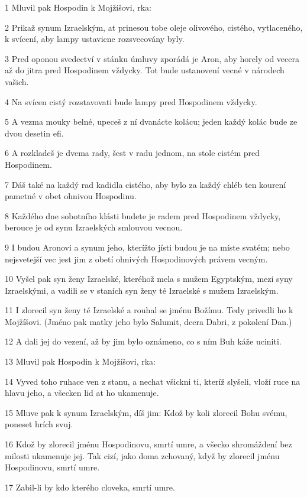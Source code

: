\par 1 Mluvil pak Hospodin k Mojžíšovi, rka:
\par 2 Prikaž synum Izraelským, at prinesou tobe oleje olivového, cistého, vytlaceného, k svícení, aby lampy ustavicne rozsvecovány byly.
\par 3 Pred oponou svedectví v stánku úmluvy zporádá je Aron, aby horely od vecera až do jitra pred Hospodinem vždycky. Tot bude ustanovení vecné v národech vašich.
\par 4 Na svícen cistý rozstavovati bude lampy pred Hospodinem vždycky.
\par 5 A vezma mouky belné, upeceš z ní dvanácte kolácu; jeden každý kolác bude ze dvou desetin efi.
\par 6 A rozkladeš je dvema rady, šest v radu jednom, na stole cistém pred Hospodinem.
\par 7 Dáš také na každý rad kadidla cistého, aby bylo za každý chléb ten kourení pametné v obet ohnivou Hospodinu.
\par 8 Každého dne sobotního klásti budete je radem pred Hospodinem vždycky, berouce je od synu Izraelských smlouvou vecnou.
\par 9 I budou Aronovi a synum jeho, kterížto jísti budou je na míste svatém; nebo nejsvetejší vec jest jim z obetí ohnivých Hospodinových právem vecným.
\par 10 Vyšel pak syn ženy Izraelské, kteréhož mela s mužem Egyptským, mezi syny Izraelskými, a vadili se v staních syn ženy té Izraelské s mužem Izraelským.
\par 11 I zlorecil syn ženy té Izraelské a rouhal se jménu Božímu. Tedy privedli ho k Mojžíšovi. (Jméno pak matky jeho bylo Salumit, dcera Dabri, z pokolení Dan.)
\par 12 A dali jej do vezení, až by jim bylo oznámeno, co s ním Buh káže uciniti.
\par 13 Mluvil pak Hospodin k Mojžíšovi, rka:
\par 14 Vyved toho ruhace ven z stanu, a nechat všickni ti, kteríž slyšeli, vloží ruce na hlavu jeho, a všecken lid at ho ukamenuje.
\par 15 Mluve pak k synum Izraelským, díš jim: Kdož by koli zlorecil Bohu svému, poneset hrích svuj.
\par 16 Kdož by zlorecil jménu Hospodinovu, smrtí umre, a všecko shromáždení bez milosti ukamenuje jej. Tak cizí, jako doma zchovaný, když by zlorecil jménu Hospodinovu, smrtí umre.
\par 17 Zabil-li by kdo kterého cloveka, smrtí umre.
